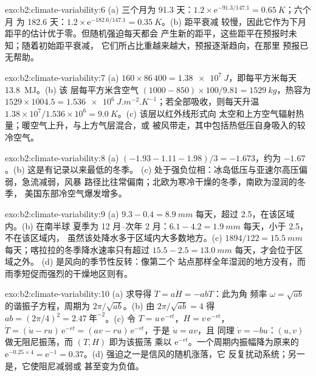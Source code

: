 \begin{solution}{exo:b2:climate-variability:6}
(a) 三个月为 91.3 天：$1.2 \times \mathrm{e}^{-91.3/147.1} = \qty{0.65}{K}$；六个月
为 182.6 天：$1.2 \times \mathrm{e}^{-182.6/147.1} = \qty{0.35}{K}$。(b) 距平衰减
较慢，因此它作为下月距平的估计优于零。但随机强迫每天都会
产生新的距平，这些距平在预报时未知；随着初始距平衰减，
它们所占比重越来越大，预报逐渐趋向，在那里
预报已无帮助。
\end{solution}

\begin{solution}{exo:b2:climate-variability:7}
(a) $160 \times 86\,400 = \qty{1.38e7}{J}$，即每平方米每天 \qty{13.8}{MJ}。(b) 该
层每平方米含空气 $(1000 - 850) \times 100/9.81 = \qty{1529}{kg}$，热容为
$1529 \times 1004.5 = \qty{1.536e6}{J.m^{-2}.K^{-1}}$；若全部吸收，则每天升温 $1.38 \times
10^7/1.536 \times 10^6 = \qty{9.0}{K}$。(c) 该层以红外线形式向
太空和上方空气辐射热量；暖空气上升，与上方气层混合，或
被风带走，其中包括热低压自身吸入的较冷空气。
\end{solution}

\begin{solution}{exo:b2:climate-variability:8}
(a) $(-1.93 - 1.11 - 1.98)/3 = -1.673$，约为 $-1.67$。(b) 这是有记录以来最低的冬季。
(c) 处于强负位相：冰岛低压与亚速尔高压偏弱，急流减弱，风暴
路径比往常偏南；北欧为寒冷干燥的冬季，南欧为湿润的冬季，
美国东部冷空气爆发增多。
\end{solution}

\begin{solution}{exo:b2:climate-variability:9}
(a) $9.3 - 0.4 = \qty{8.9}{mm}$ 每天，超过 2.5，在该区域内。(b) 在南半球
夏季为 12 月–次年 2 月：$6.1 - 4.2 = \qty{1.9}{mm}$ 每天，小于 2.5，不在该区域内，
虽然该处降水多于区域内大多数地方。(c) $1894/122 = \qty{15.5}{mm}$
每天；喀拉拉的冬季降水速率只有超过 $15.5 - 2.5 = \qty{13.0}{mm}$ 每天，才会位于区域之外。
(d) 是风向的季节性反转：像第二个
站点那样全年湿润的地方没有，而雨季短促而强烈的干燥地区则有。
\end{solution}

\begin{solution}{exo:b2:climate-variability:10}
(a) 求导得 $\ddot T = a\dot H = -abT$：此为角
频率 $\omega = \sqrt{ab}$ 的谐振子方程，周期为 $2\pi/\sqrt{ab}$。(b) 由 $2\pi/\sqrt{ab} = 4$ 得 $ab =
(2\pi/4)^2 = \qty{2.47}{\text{年}^{-2}}$。(c) 令 $T = u\,\mathrm{e}^{-rt}$，$H = v\,\mathrm{e}^{-rt}$，
$\dot T = (\dot u - ru)\,\mathrm{e}^{-rt} = (av - ru)\,\mathrm{e}^{-rt}$，于是 $\dot u = av$，且
同理 $\dot v = -bu$：$(u, v)$ 做无阻尼振荡，而 $(T, H)$ 即为该振荡
乘以 $\mathrm{e}^{-rt}$。一个周期内振幅降为原来的 $\mathrm{e}^{-0.25 \times
4} = \mathrm{e}^{-1} = 0.37$。(d) 强迫之一是信风的随机涨落，它
反复扰动系统；另一是，它使阻尼减弱或
甚至变为负值。
\end{solution}

